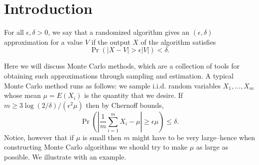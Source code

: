 \section{Introduction}
For all $\epsilon, \delta > 0$, we say that a randomized algorithm gives an $(\epsilon, \delta)$ approximation for a value $V$ if the output $X$ of the algorithm satisfies
\[\Pr (|X - V| > \epsilon |V|) < \delta.\]

Here we will discuss Monte Carlo methods, which are a collection of tools for obtaining such approximations through sampling and estimation. A typical Monte Carlo method runs as follows: we sample i.i.d. random variables $X_1, \ldots, X_m$ whose mean $\mu = E(X_i)$ is the quantity that we desire. If $m \geq 3 \log (2 / \delta) / (\epsilon^2 \mu)$ then by Chernoff bounds,
\[\Pr \left( \left| \frac{1}{m} \sum_{i = 1}^m X_i - \mu \right| \geq \epsilon \mu \right) \leq \delta.\]
Notice, however that if $\mu$ is small then $m$ might have to be very large--hence when constructing Monte Carlo algorithms we should try to make $\mu$ as large as possible. We illustrate with an example.